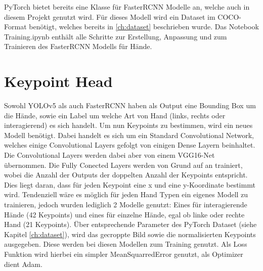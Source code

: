 PyTorch bietet bereits eine Klasse für FasterRCNN Modelle an, welche auch in diesem Projekt genutzt wird.
Für dieses Modell wird ein Dataset im COCO-Format benötigt, welches bereits in \ref{ch:dataset} beschrieben wurde.
Das Notebook Training.ipynb enthält alle Schritte zur Erstellung, Anpassung und zum Trainieren des FasterRCNN Modells für Hände.

\section{Keypoint Head}

Sowohl YOLOv5 als auch FasterRCNN haben als Output eine Bounding Box um die Hände, sowie ein Label um welche Art von Hand (links, rechts oder interagierend) es sich handelt.
Um nun Keypoints zu bestimmen, wird ein neues Modell benötigt.
Dabei handelt es sich um ein Standard Convolutional Network, welches einige Convolutional Layers gefolgt von einigen Dense Layern beinhaltet.
Die Convolutional Layers werden dabei aber von einem VGG16-Net übernommen.
Die Fully Conected Layers werden von Grund auf an trainiert, wobei die Anzahl der Outputs der doppelten Anzahl der Keypoints entspricht.
Dies liegt daran, dass für jeden Keypoint eine x und eine y-Koordinate bestimmt wird.
Tendenziell wäre es möglich für jeden Hand Typen ein eigenes Modell zu trainieren, jedoch wurden lediglich 2 Modelle genutzt: Eines für interagierende Hände (42 Keypoints) und eines für einzelne Hände, egal ob linke oder rechte Hand (21 Keypoints).
Über entsprechende Parameter des PyTorch Dataset (siehe Kapitel \ref{ch:dataset}), wird das gecroppte Bild sowie die normalisierten Keypoints ausgegeben.
Diese werden bei diesen Modellen zum Training genutzt.
Als Loss Funktion wird hierbei ein simpler MeanSquarredError genutzt, als Optimizer dient Adam.

